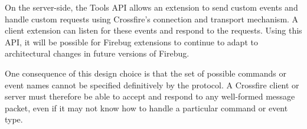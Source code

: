 On the server-side, the Tools API allows an extension to send custom events
and handle custom requests using Crossfire's connection and transport mechanism.
A client extension can listen for these events and respond to the requests.
Using this API, it will be possible for Firebug extensions to continue to adapt
to architectural changes in future versions of Firebug.

One consequence of this design choice is that the set of possible commands or
event names cannot be specified definitively by the protocol. A Crossfire
client or server must therefore be able to accept and respond to any well-formed
message packet, even if it may not know how to handle a particular command or
event type.
